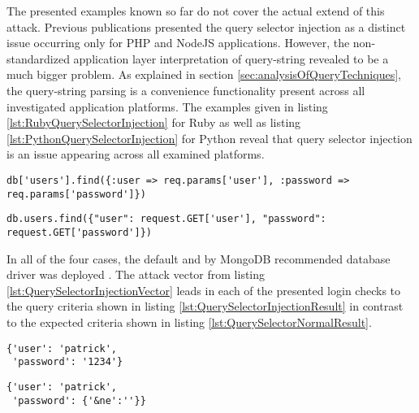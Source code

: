 The presented examples known so far do not cover the actual extend of this attack. Previous publications presented the query selector injection as a distinct issue occurring only for PHP and NodeJS applications. However, the non-standardized application layer interpretation of query-string revealed to be a much bigger problem. As explained in section \ref{sec:analysisOfQueryTechniques}, the query-string parsing is a convenience functionality present across all investigated application platforms. The examples given in listing \ref{lst:RubyQuerySelectorInjection} for Ruby as well as listing \ref{lst:PythonQuerySelectorInjection} for Python reveal that query selector injection is an issue appearing across all examined platforms. \\

\begin{lstlisting}[caption={Vulnerable Ruby example for query selector injection against MongoDB}, label={lst:RubyQuerySelectorInjection}]
db['users'].find({:user => req.params['user'], :password => req.params['password']})
\end{lstlisting}

\begin{lstlisting}[caption={Vulnerable Python example for query selector injection against MongoDB}, label={lst:PythonQuerySelectorInjection}]
db.users.find({"user": request.GET['user'], "password": request.GET['password']})
\end{lstlisting}

In all of the four cases, the default and by MongoDB recommended database driver was deployed \cite{MongoDB_Drivers2016}. The attack vector from listing \ref{lst:QuerySelectorInjectionVector} leads in each of the presented login checks to the query criteria shown in listing \ref{lst:QuerySelectorInjectionResult} in contrast to the expected criteria shown in listing \ref{lst:QuerySelectorNormalResult}. \\

\begin{minipage}{.97\textwidth}
\begin{minipage}[t]{.49\textwidth}
\begin{lstlisting}[caption={Resulting query of normal request}, label={lst:QuerySelectorNormalResult}]
{'user': 'patrick', 
 'password': '1234'}
\end{lstlisting}
\end{minipage}
\hfill
\begin{minipage}[t]{.49\textwidth}
\begin{lstlisting}[escapechar=!,caption={Resulting query of query selector injection}, label={lst:QuerySelectorInjectionResult}]
{'user': 'patrick',
 'password': {'&ne':''}}
\end{lstlisting}
\end{minipage}
\end{minipage}

